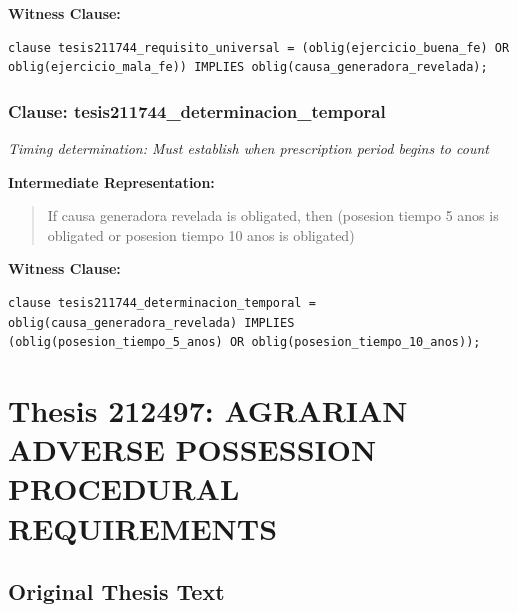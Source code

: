 \documentclass[11pt,a4paper]{article}
\begin{document}
\textbf{Witness Clause:}

\begin{lstlisting}[style=witnessstyle, language=Witness]
clause tesis211744_requisito_universal = (oblig(ejercicio_buena_fe) OR oblig(ejercicio_mala_fe)) IMPLIES oblig(causa_generadora_revelada);
\end{lstlisting}

\subsubsection{Clause: tesis211744\_determinacion\_temporal}

\textit{Timing determination: Must establish when prescription period begins to count}

\textbf{Intermediate Representation:}

\begin{quote}
If causa generadora revelada is obligated, then (posesion tiempo 5 anos is obligated or posesion tiempo 10 anos is obligated)
\end{quote}

\textbf{Witness Clause:}

\begin{lstlisting}[style=witnessstyle, language=Witness]
clause tesis211744_determinacion_temporal = oblig(causa_generadora_revelada) IMPLIES (oblig(posesion_tiempo_5_anos) OR oblig(posesion_tiempo_10_anos));
\end{lstlisting}

\newpage

\section{Thesis 212497: AGRARIAN ADVERSE POSSESSION PROCEDURAL REQUIREMENTS}
\label{thesis:212497}

\subsection{Original Thesis Text}
\end{document}
